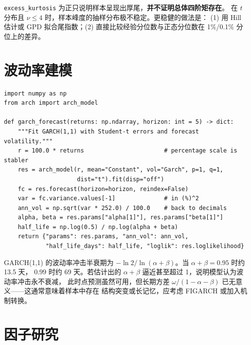 \begin{keybox}[判断「肥尾」的正确姿势]
\texttt{excess\_kurtosis} 为正只说明样本呈现出厚尾，\textbf{并不证明总体四阶矩存在}。
在 $t$ 分布且 $\nu\le 4$ 时，样本峰度的抽样分布极不稳定。更稳健的做法是：
(1) 用 Hill 估计或 GPD 拟合尾指数；(2) 直接比较经验分位数与正态分位数在 1\%/0.1\% 分位上的差异。
\end{keybox}

\section{波动率建模}

\begin{lstlisting}[style=pythonstyle,
  caption={用 arch 拟合 GARCH(1,1)-t 并预测年化波动率},
  label={lst:garch}]
import numpy as np
from arch import arch_model

def garch_forecast(returns: np.ndarray, horizon: int = 5) -> dict:
    """Fit GARCH(1,1) with Student-t errors and forecast volatility."""
    r = 100.0 * returns                       # percentage scale is stabler
    res = arch_model(r, mean="Constant", vol="Garch", p=1, q=1,
                     dist="t").fit(disp="off")
    fc = res.forecast(horizon=horizon, reindex=False)
    var = fc.variance.values[-1]              # in (%)^2
    ann_vol = np.sqrt(var * 252.0) / 100.0    # back to decimals
    alpha, beta = res.params["alpha[1]"], res.params["beta[1]"]
    half_life = np.log(0.5) / np.log(alpha + beta)
    return {"params": res.params, "ann_vol": ann_vol,
            "half_life_days": half_life, "loglik": res.loglikelihood}
\end{lstlisting}

\begin{notebox}[持久性与半衰期]
GARCH(1,1) 的波动率冲击半衰期为 $-\ln 2/\ln(\alpha+\beta)$。当 $\alpha+\beta=0.95$ 时约 13.5 天，
$0.99$ 时约 69 天。若估计出的 $\alpha+\beta$ 逼近甚至超过 1，说明模型认为波动率冲击永不衰减，
此时点预测虽然可用，但长期方差 $\omega/(1-\alpha-\beta)$ 已无意义——这通常意味着样本中存在
结构突变或长记忆，应考虑 FIGARCH 或加入机制转换。
\end{notebox}

\section{因子研究}

